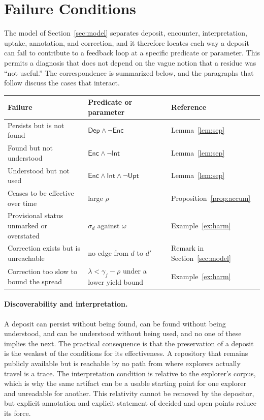 \documentclass[11pt]{article}
\theoremstyle{definition}
\theoremstyle{remark}
\newcommand{\Dep}{\mathsf{Dep}}
\newcommand{\Enc}{\mathsf{Enc}}
\newcommand{\Int}{\mathsf{Int}}
\newcommand{\Upt}{\mathsf{Upt}}
\begin{document}
\section{Failure Conditions}\label{sec:fail}

The model of Section~\ref{sec:model} separates deposit, encounter, interpretation, uptake, annotation, and correction, and it therefore locates each way a deposit can fail to contribute to a feedback loop at a specific predicate or parameter. This permits a diagnosis that does not depend on the vague notion that a residue was ``not useful.'' The correspondence is summarized below, and the paragraphs that follow discuss the cases that interact.

\begin{center}
\begin{tabular}{p{}p{}p{}}
\hline
Failure & Predicate or parameter & Reference \\
\hline
Persists but is not found & $\Dep\wedge\neg\Enc$ & Lemma~\ref{lem:sep} \\
Found but not understood & $\Enc\wedge\neg\Int$ & Lemma~\ref{lem:sep} \\
Understood but not used & $\Enc\wedge\Int\wedge\neg\Upt$ & Lemma~\ref{lem:sep} \\
Ceases to be effective over time & large $\rho$ & Proposition~\ref{prop:accum} \\
Provisional status unmarked or overstated & $\sigma_d$ against $\omega$ & Example~\ref{ex:harm} \\
Correction exists but is unreachable & no edge from $d$ to $d'$ & Remark in Section~\ref{sec:model} \\
Correction too slow to bound the spread & $\lambda<\gamma_f-\rho$ under a lower yield bound & Example~\ref{ex:harm} \\
\hline
\end{tabular}
\end{center}

\paragraph{Discoverability and interpretation.} A deposit can persist without being found, can be found without being understood, and can be understood without being used, and no one of these implies the next. The practical consequence is that the preservation of a deposit is the weakest of the conditions for its effectiveness. A repository that remains publicly available but is reachable by no path from where explorers actually travel is a trace. The interpretation condition is relative to the explorer's corpus, which is why the same artifact can be a usable starting point for one explorer and unreadable for another. This relativity cannot be removed by the depositor, but explicit annotation and explicit statement of decided and open points reduce its force.
\end{document}
